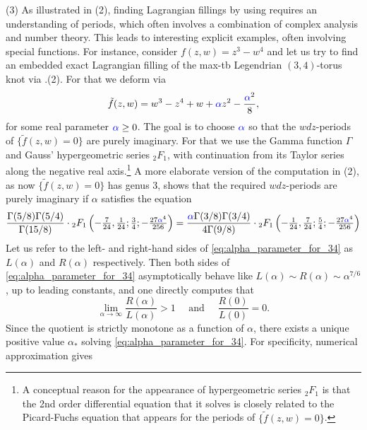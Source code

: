 \begin{example}
\noindent (3) As illustrated in (2), finding Lagrangian fillings by using  requires an understanding of periods, which often involves a combination of complex analysis and number theory. This leads to interesting explicit examples, often involving special functions. For instance, consider $f(z,w)=z^3-w^4$ and let us try to find an embedded exact Lagrangian filling of the max-tb Legendrian $(3,4)$-torus knot via .(2). For that we deform via
\begin{equation}\label{eq:e6-fb}
\tilde{f}(z,w)=w^3-z^4+w+\textcolor{blue}{\alpha}z^2-\frac{\textcolor{blue}{\alpha}^2}{8},
\end{equation}
for some real parameter $\textcolor{blue}{\alpha}\geq0$. The goal is to choose $\textcolor{blue}{\alpha}$ so that the $wdz$-periods of $\{\tilde{f}(z,w)=0\}$ are purely imaginary. For that we use the Gamma function $\Gamma$ and Gauss' hypergeometric series ${}_2F_1$, with continuation from its Taylor series
along the negative real axis.\footnote{\noindent A conceptual reason for the appearance of hypergeometric series ${}_2F_1$ is that the 2nd order differential equation that it solves is closely related to the Picard-Fuchs equation that appears for the periods of $\{\tilde{f}(z,w)=0\}$.} A more elaborate version of the computation in (2), as now $\{\tilde{f}(z,w)=0\}$ has genus 3, shows that the required $wdz$-periods are purely imaginary if $\alpha$ satisfies the equation
\begin{equation}\label{eq:alpha_parameter_for_34}
\frac{\Gamma(5/8)\Gamma(5/4)}{\Gamma(15/8)}\cdot {}_2F_1\left(-\tfrac7{24},\tfrac1{24};\tfrac34;
                         -\tfrac{27\textcolor{blue}{\alpha}^4}{256}\right) = \frac{\textcolor{blue}{\alpha}\Gamma(3/8)\Gamma(3/4)}{4\Gamma(9/8)}\cdot{}_2F_1\left(-\tfrac1{24},\tfrac7{24};\tfrac54;
                         -\tfrac{27\textcolor{blue}{\alpha}^4}{256}\right)
\end{equation}
\noindent Let us refer to the left- and right-hand sides of \eqref{eq:alpha_parameter_for_34} as $L(\alpha)$ and $R(\alpha)$ respectively. Then both sides of \eqref{eq:alpha_parameter_for_34} asymptotically behave like $L(\alpha)\sim R(\alpha)\sim \alpha^{7/6}$, up to leading constants, and one directly computes that
$$\displaystyle\lim_{\alpha\to\infty}\frac{R(\alpha)}{L(\alpha)}>1\quad\mbox { and }\quad \frac{R(0)}{L(0)}=0.$$
Since the quotient is strictly monotone as a function of $\alpha$, there exists a unique positive value $\alpha_\ast$ solving \eqref{eq:alpha_parameter_for_34}. For specificity, numerical approximation gives

\end{example}
